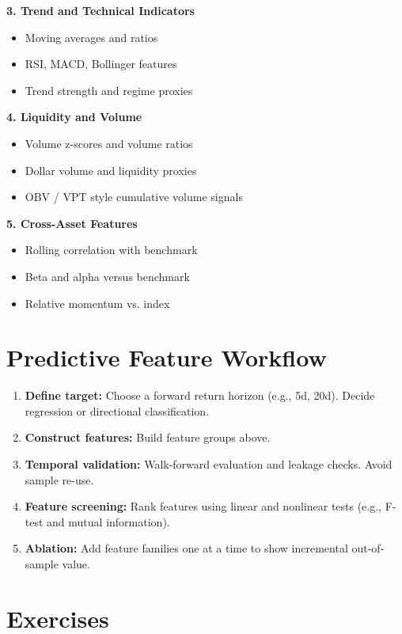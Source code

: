 \documentclass[11pt]{article}
\begin{document}
\textbf{3. Trend and Technical Indicators}

\begin{itemize}[leftmargin=*]
  \item Moving averages and ratios
  \item RSI, MACD, Bollinger features
  \item Trend strength and regime proxies
\end{itemize}

\textbf{4. Liquidity and Volume}

\begin{itemize}[leftmargin=*]
  \item Volume z-scores and volume ratios
  \item Dollar volume and liquidity proxies
  \item OBV / VPT style cumulative volume signals
\end{itemize}

\textbf{5. Cross-Asset Features}

\begin{itemize}[leftmargin=*]
  \item Rolling correlation with benchmark
  \item Beta and alpha versus benchmark
  \item Relative momentum vs. index
\end{itemize}

\section*{Predictive Feature Workflow}

\begin{enumerate}[leftmargin=*]
  \item \textbf{Define target:} Choose a forward return horizon
  (e.g., 5d, 20d). Decide regression or directional classification.
  \item \textbf{Construct features:} Build feature groups above.
  \item \textbf{Temporal validation:} Walk-forward evaluation and
  leakage checks. Avoid sample re-use.
  \item \textbf{Feature screening:} Rank features using linear and nonlinear
  tests (e.g., F-test and mutual information).
  \item \textbf{Ablation:} Add feature families one at a time to show
  incremental out-of-sample value.
\end{enumerate}

\section*{Exercises}
\end{document}
